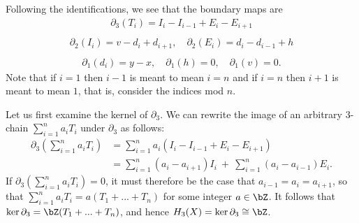 \begin{homework}[e]
\begin{prf}
\begin{itemize}
    \end{itemize}
    Following the identifications, we see that the boundary maps are
    \begin{align*}
      \partial_3(T_i) = I_i - I_{i-1} + E_i - E_{i+1} \\
    \end{align*}
    \begin{align*}
      \partial_2(I_i) = v - d_i  + d_{i+1}, \hspace{1em} \partial_2(E_i) = d_i - d_{i-1} + h \\
    \end{align*}
    \begin{align*}
      \partial_1(d_i) = y - x, \hspace{1em} \partial_1(h) = 0, \hspace{1em} \partial_1(v) = 0.
    \end{align*}
    Note that if $i = 1$ then $i - 1$ is meant to mean $i = n$ and if $i = n$ then $i + 1$ is meant to mean $1$, that is, consider the indices mod $n$.

    Let us first examine the kernel of $\partial_3$. We can rewrite the image of an arbitrary $3$-chain $\sum_{i=1}^n a_i T_i$ under $\partial_3$ as follows:
    \begin{align*}
      \partial_3\left(\sum_{i=1}^n a_i T_i\right) 
      &= \sum_{i=1}^n a_i(I_i - I_{i-1} + E_i - E_{i+1}) \\
      &= \sum_{i=1}^n (a_i - a_{i+1})I_i ~+~ \sum_{i=1}^n (a_i - a_{i-1})E_i.
    \end{align*}
    If $\partial_3\left(\sum_{i=1}^n a_i T_i\right) = 0$, it must therefore be the case that $a_{i-1} = a_i = a_{i+1}$, so that $\sum_{i=1}^n a_i T_i = a(T_1+ ... + T_n)$ for some integer $a \in \bZ$. It follows that $\ker \partial_3 = \bZ(T_1+...+T_n)$, and hence $H_3(X) = \ker\partial_3 \cong \bZ$.


\end{prf}
\end{homework}
